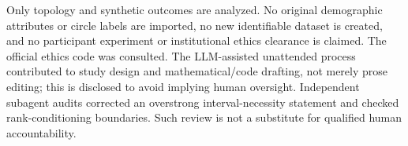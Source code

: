 \documentclass{article}
\begin{document}
Only topology and synthetic outcomes are analyzed. No original demographic attributes or circle labels are imported, no new identifiable dataset is created, and no participant experiment or institutional ethics clearance is claimed. The official ethics code was consulted. The LLM-assisted unattended process contributed to study design and mathematical/code drafting, not merely prose editing; this is disclosed to avoid implying human oversight. Independent subagent audits corrected an overstrong interval-necessity statement and checked rank-conditioning boundaries. Such review is not a substitute for qualified human accountability.

\clearpage

\end{document}
